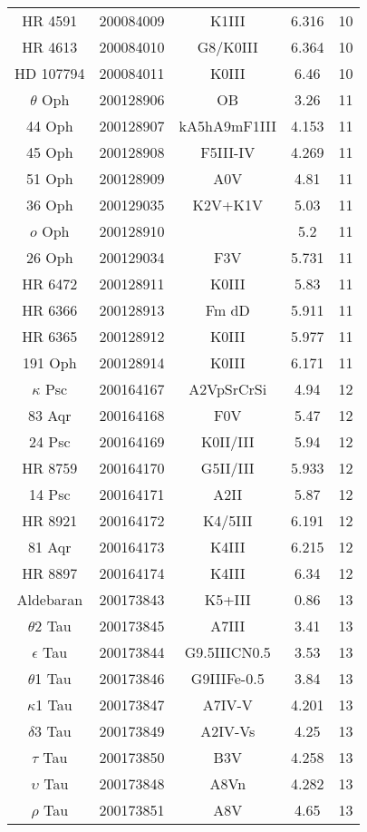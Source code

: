 \begin{table*}
\begin{tabular}{ccccc}
HR 4591 & 200084009 & K1III & 6.316 & 10 \\
HR 4613 & 200084010 & G8/K0III & 6.364 & 10 \\
HD 107794 & 200084011 & K0III & 6.46 & 10 \\
$\theta$ Oph & 200128906 & OB & 3.26 & 11 \\
44 Oph & 200128907 & kA5hA9mF1III & 4.153 & 11 \\
45 Oph & 200128908 & F5III-IV & 4.269 & 11 \\
51 Oph & 200128909 & A0V & 4.81 & 11 \\
36 Oph & 200129035 & K2V+K1V & 5.03 & 11 \\
$o$ Oph & 200128910 &  & 5.2 & 11 \\
26 Oph & 200129034 & F3V & 5.731 & 11 \\
HR 6472 & 200128911 & K0III & 5.83 & 11 \\
HR 6366 & 200128913 & Fm dD & 5.911 & 11 \\
HR 6365 & 200128912 & K0III & 5.977 & 11 \\
191 Oph & 200128914 & K0III & 6.171 & 11 \\
$\kappa$ Psc & 200164167 & A2VpSrCrSi & 4.94 & 12 \\
83 Aqr & 200164168 & F0V & 5.47 & 12 \\
24 Psc & 200164169 & K0II/III & 5.94 & 12 \\
HR 8759 & 200164170 & G5II/III & 5.933 & 12 \\
14 Psc & 200164171 & A2II & 5.87 & 12 \\
HR 8921 & 200164172 & K4/5III & 6.191 & 12 \\
81 Aqr & 200164173 & K4III & 6.215 & 12 \\
HR 8897 & 200164174 & K4III & 6.34 & 12 \\
Aldebaran & 200173843 & K5+III & 0.86 & 13 \\
$\theta$2 Tau & 200173845 & A7III & 3.41 & 13 \\
$\epsilon$ Tau & 200173844 & G9.5IIICN0.5 & 3.53 & 13 \\
$\theta$1 Tau & 200173846 & G9IIIFe-0.5 & 3.84 & 13 \\
$\kappa$1 Tau & 200173847 & A7IV-V & 4.201 & 13 \\
$\delta$3 Tau & 200173849 & A2IV-Vs & 4.25 & 13 \\
$\tau$ Tau & 200173850 & B3V & 4.258 & 13 \\
$\upsilon$ Tau & 200173848 & A8Vn & 4.282 & 13 \\
$\rho$ Tau & 200173851 & A8V & 4.65 & 13 \\

\end{tabular}
\end{table*}
